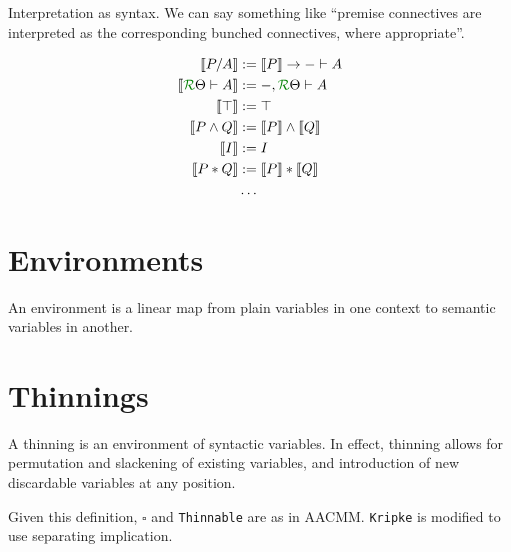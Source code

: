 \documentclass[a4paper]{article}
\begin{document}
Interpretation as syntax.
We can say something like ``premise connectives are interpreted as the
corresponding bunched connectives, where appropriate''.

\begin{align*}
  \sem{P/A} &:= \sem P \to {- \vdash A} \\
  \sem{\ctx \Theta R \vdash A} &:= {-, \ctx \Theta R \vdash A} \\
  \sem{\top} &:= \top \\
  \sem{P \wedge Q} &:= \sem P \wedge \sem Q \\
  \sem{I} &:= I \\
  \sem{P * Q} &:= \sem P * \sem Q \\
  &\ldots
\end{align*}

\section{Environments}

An environment is a linear map from plain variables in one context to semantic
variables in another.

\section{Thinnings}

A thinning is an environment of syntactic variables.
In effect, thinning allows for permutation and slackening of existing
variables, and introduction of new discardable variables at any position.

Given this definition, $\square$ and \texttt{Thinnable} are as in AACMM.
\texttt{Kripke} is modified to use separating implication.
\end{document}
